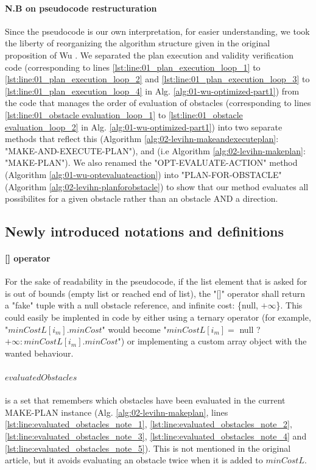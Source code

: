 \paragraph{N.B on pseudocode restructuration} Since the pseudocode is our own interpretation, for easier understanding, we took the liberty of reorganizing the algorithm structure given in the original proposition of Wu \parencite{wu_navigation_2010}. We separated the plan execution and validity verification code (corresponding to lines \ref{lst:line:01_plan_execution_loop_1} to \ref{lst:line:01_plan_execution_loop_2} and \ref{lst:line:01_plan_execution_loop_3} to \ref{lst:line:01_plan_execution_loop_4} in Alg. \ref{alg:01-wu-optimized-part1}) from the code that manages the order of evaluation of obstacles (corresponding to lines \ref{lst:line:01_obstacle evaluation_loop_1} to \ref{lst:line:01_obstacle evaluation_loop_2} in Alg. \ref{alg:01-wu-optimized-part1}) into two separate methods that reflect this (Algorithm \ref{alg:02-levihn-makeandexecuteplan}: "MAKE-AND-EXECUTE-PLAN"), and (i.e Algorithm \ref{alg:02-levihn-makeplan}: "MAKE-PLAN"). We also renamed the "OPT-EVALUATE-ACTION" method (Algorithm \ref{alg:01-wu-optevaluateaction}) into "PLAN-FOR-OBSTACLE" (Algorithm \ref{alg:02-levihn-planforobstacle}) to show that our method evaluates all possibilites for a given obstacle rather than an obstacle AND a direction.

\subsection{Newly introduced notations and definitions}

\paragraph{[] operator} For the sake of readability in the pseudocode, if the list element that is asked for is out of bounds (empty list or reached end of list), the "[]" operator shall return a "fake" tuple with a null obstacle reference, and infinite cost: \{null, $+\infty$\}. This could easily be implented in code by either using a ternary operator (for example, "$minCostL[i_{m}].minCost$" would become "$minCostL[i_{m}] =$ null ? $+\infty: minCostL[i_{m}].minCost$") or implementing a custom array object with the wanted behaviour.

\paragraph{$evaluatedObstacles$} is a set that remembers which obstacles have been evaluated in the current MAKE-PLAN instance (Alg. \ref{alg:02-levihn-makeplan}, lines \ref{lst:line:evaluated_obstacles_note_1}, \ref{lst:line:evaluated_obstacles_note_2}, \ref{lst:line:evaluated_obstacles_note_3}, \ref{lst:line:evaluated_obstacles_note_4} and \ref{lst:line:evaluated_obstacles_note_5}). This is not mentioned in the original article, but it avoids evaluating an obstacle twice when it is added to $minCostL$.

